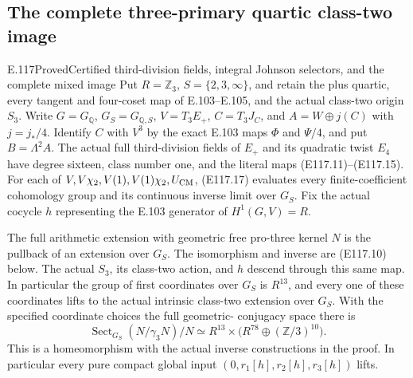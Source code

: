 \subsection*{The complete three-primary quartic class-two image}
\begin{statement}{E.117}{Proved}{Certified third-division fields, integral Johnson selectors, and the complete mixed image}
Put $R=\mathbb Z_3$, $S=\{2,3,\infty\}$, and retain the
plus quartic, every tangent and four-coset map of E.103--E.105,
and the actual class-two origin $S_3$.
Write $G=G_{\mathbb Q}$, $G_S=G_{\mathbb Q,S}$,
$V=T_3E_+$, $C=T_3J_C$, and $A=W\oplus j(C)$ with $j=j_*/4$.
Identify $C$ with $V^3$ by the exact E.103 maps $\Phi$ and $\Psi/4$,
and put $B=\Lambda^2 A$.  The actual full third-division fields
of $E_+$ and its quadratic twist $E_4$ have degree sixteen,
class number one, and the literal maps (E117.11)--(E117.15).
For each of $V,V\chi_2,V(1),V(1)\chi_2,U_{\rm CM}$,
(E117.17) evaluates every finite-coefficient cohomology group
and its continuous inverse limit over $G_S$.  Fix the actual cocycle $h$ representing
the E.103 generator of $H^1(G,V)=R$.

The full arithmetic extension with geometric free pro-three
kernel $N$ is the pullback of an extension over $G_S$.
The isomorphism and inverse are (E117.10) below.
The actual $S_3$, its class-two action, and $h$ descend through
this same map.  In particular the group of first coordinates
over $G_S$ is $R^{13}$, and every one of these coordinates
lifts to the actual intrinsic class-two extension over $G_S$.
With the specified coordinate choices the full geometric-
conjugacy space there is
\[
 \operatorname{Sect}_{G_S}(N/\gamma_3N)/N
       \simeq R^{13}\times\bigl(R^{78}\oplus(\mathbb Z/3)^{10}\bigr).
 \tag{E117.1}
\]
This is a homeomorphism with the actual inverse constructions
in the proof.  In particular every pure compact global input
$(0,r_1[h],r_2[h],r_3[h])$ lifts.


\end{statement}
